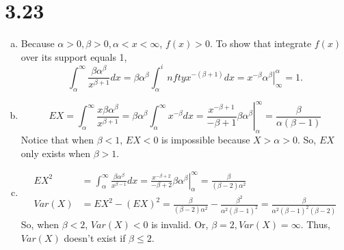 \documentclass[letter]{article}
\begin{document}
    \section*{3.23}
    \begin{enumerate}[(a)]
        \item Because $\alpha > 0, \beta > 0, \alpha < x < \infty$, $f(x) > 0$.
        To show that integrate $f(x)$ over its support equals 1, 
        \[
        \int_\alpha^\infty \frac{\beta \alpha^\beta}{x^{\beta+1}} dx = \beta \alpha^\beta \int_\alpha^infty x^{-(\beta+1)} dx = \left. x^{-\beta} \alpha^\beta \right|^\alpha_\infty = 1.
        \]
        \item
        \[
        EX = \int_\alpha^\infty \frac{x \beta \alpha^\beta}{x^{\beta+1}} = 
        \beta \alpha^\beta \int_\alpha^\infty x^{-\beta} dx = \left. \frac{x^{-\beta+1}}{-\beta+1} \beta \alpha^\beta \right|^\infty_\alpha = \frac{\beta}{\alpha(\beta-1)}
        \]
        Notice that when $\beta < 1$, $EX < 0$ is impossible because $X > \alpha > 0$. So, $EX$ only exists when $\beta > 1$.
        \item 
        \begin{align*}
        EX^2 & = \int_\alpha^\infty \frac{\beta \alpha^\beta}{x^{\beta-1}} dx =
        \left. \frac{x^{-\beta+2}}{-\beta+2} \beta \alpha^\beta \right|_\alpha^\infty = \frac{\beta}{(\beta-2)\alpha^2} \\
        Var(X) &= EX^2 - (EX)^2 = \frac{\beta}{(\beta-2)\alpha^2} - \frac{\beta^2}{\alpha^2 (\beta-1)^2} = \frac{\beta}{\alpha^2 (\beta-1)^2 (\beta-2)}
        \end{align*}
        So, when $\beta < 2$, $Var(X) < 0$ is invalid. Or, $\beta = 2, Var(X) = \infty$. Thus, $Var(X)$ doesn't exist if $\beta \le 2$.
    \end{enumerate}
\end{document}
